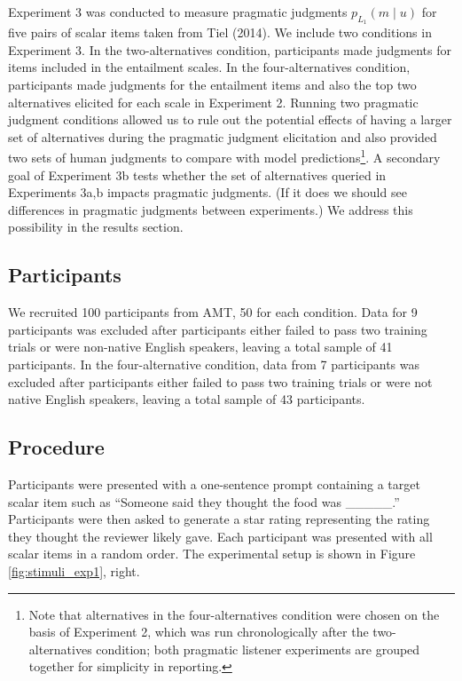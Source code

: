 \documentclass[10pt, letterpaper]{article}
\begin{document}
Experiment 3 was conducted to measure pragmatic judgments
\(p_{L_1}(m \mid u)\) for five pairs of scalar items taken from Tiel
(2014). We include two conditions in Experiment 3. In the
two-alternatives condition, participants made judgments for items
included in the entailment scales. In the four-alternatives condition,
participants made judgments for the entailment items and also the top
two alternatives elicited for each scale in Experiment 2. Running two
pragmatic judgment conditions allowed us to rule out the potential
effects of having a larger set of alternatives during the pragmatic
judgment elicitation and also provided two sets of human judgments to
compare with model
predictions\footnote{Note that alternatives in the four-alternatives condition were chosen on the basis of Experiment 2, which was run chronologically after the two-alternatives condition; both pragmatic listener experiments are grouped together for simplicity in reporting.}.
A secondary goal of Experiment 3b tests whether the set of alternatives
queried in Experiments 3a,b impacts pragmatic judgments. (If it does we
should see differences in pragmatic judgments between experiments.) We
address this possibility in the results section.

\subsection{Participants}\label{participants-2}

We recruited 100 participants from AMT, 50 for each condition. Data for
9 participants was excluded after participants either failed to pass two
training trials or were non-native English speakers, leaving a total
sample of 41 participants. In the four-alternative condition, data from
7 participants was excluded after participants either failed to pass two
training trials or were not native English speakers, leaving a total
sample of 43 participants.

\subsection{Procedure}\label{procedure}

Participants were presented with a one-sentence prompt containing a
target scalar item such as ``Someone said they thought the food was
\_\_\_\_\_.'' Participants were then asked to generate a star rating
representing the rating they thought the reviewer likely gave. Each
participant was presented with all scalar items in a random order. The
experimental setup is shown in Figure \ref{fig:stimuli_exp1}, right.
\end{document}
